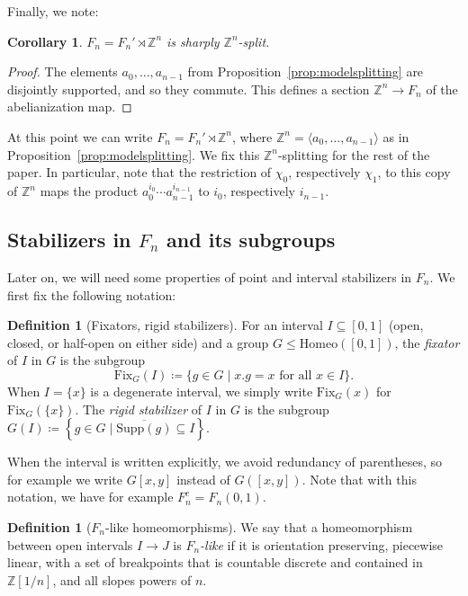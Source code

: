 \documentclass[10pt,a4paper]{article}
\newtheorem{coro}[cdrthm]{Corollary}
\theoremstyle{definition}
\newtheorem{defi}[cdrthm]{Definition}
\theoremstyle{remark}
\newcommand{\Z}{\mathbb{Z}}
\newcommand{\Homeo}{\mathrm{Homeo}}
\newcommand{\Supp}{\mathrm{Supp}}
\newcommand{\Fix}{\mathrm{Fix}}
\theoremstyle{plain}
\begin{document}
Finally, we note:

\begin{coro}
\label{cor:Fsplit}
$F_n = F_n' \rtimes \Z^n$ is sharply $\Z^n$-split.
\end{coro}

\begin{proof}
The elements $a_0, \ldots, a_{n-1}$ from Proposition~\ref{prop:modelsplitting} are disjointly supported, and so they commute. This defines a section $\Z^n \to F_n$ of the abelianization map.
\end{proof}

At this point we can write $F_n = F_n' \rtimes \Z^n$, where $\Z^n = \langle a_0, \ldots, a_{n-1} \rangle$ as in Proposition~\ref{prop:modelsplitting}. We fix this $\Z^n$-splitting for the rest of the paper. In particular, note that the restriction of $\chi_0$, respectively $\chi_1$, to this copy of $\Z^n$ maps the product $a_0^{i_0}\cdots a_{n-1}^{i_{n-1}}$ to $i_0$, respectively $i_{n-1}$.


\subsection{Stabilizers in \texorpdfstring{$F_n$}{Fn} and its subgroups}

Later on, we will need some properties of point and interval stabilizers in $F_n$. We first fix the following notation:

\begin{defi}[Fixators, rigid stabilizers]
For an interval $I \subseteq [0, 1]$ (open, closed, or half-open on either side) and a group $G \leq \Homeo([0, 1])$, the \emph{fixator} of $I$ in $G$ is the subgroup
\[
\Fix_G(I) \coloneqq \{ g \in G \mid x.g = x \text{ for all } x \in I \}.
\]
When $I = \{ x \}$ is a degenerate interval, we simply write $\Fix_G(x)$ for $\Fix_G(\{x\})$. The \emph{rigid stabilizer} of $I$ in $G$ is the subgroup $G(I) \coloneqq \left\{ g \in G \mid \overline{\Supp(g)} \subseteq I \right\}$.
\end{defi}

When the interval is written explicitly, we avoid redundancy of parentheses, so for example we write $G[x, y]$ instead of $G([x, y])$. Note that with this notation, we have for example $F_n^c = F_n(0, 1)$.

\begin{defi}[$F_n$-like homeomorphisms]
We say that a homeomorphism between open intervals $I \to J$ is \emph{$F_n$-like} if it is orientation preserving, piecewise linear, with a set of breakpoints that is countable discrete and contained in $\Z[1/n]$, and all slopes powers of $n$.
\end{defi}
\end{document}
